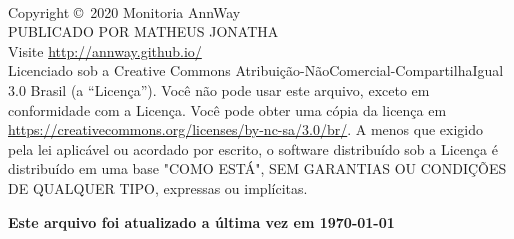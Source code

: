 \newpage
~\vfill
\thispagestyle{empty}

\noindent Copyright \copyright\ 2020 Monitoria AnnWay\\ %

\noindent PUBLICADO POR MATHEUS JONATHA\\ %

\noindent  Visite \url{http://annway.github.io/}\\ %

\noindent Licenciado sob a Creative Commons Atribuição-NãoComercial-CompartilhaIgual 3.0 Brasil (a “Licença”).
Você não pode usar este arquivo, exceto em conformidade com a Licença. Você pode obter uma cópia da licença em \url{https://creativecommons.org/licenses/by-nc-sa/3.0/br/}. A menos que exigido pela lei aplicável ou acordado por escrito, o software distribuído sob a Licença é distribuído em uma base "COMO ESTÁ", SEM
GARANTIAS OU CONDIÇÕES DE QUALQUER TIPO, expressas ou implícitas.

\vspace{1cm}
\noindent \textbf{Este arquivo foi atualizado a última vez em \today}